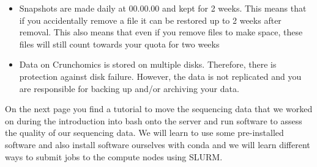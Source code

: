 \documentclass[
  letterpaper,
  DIV=11,
  numbers=noendperiod]{scrreprt}
\providecommand{\tightlist}{%
  \setlength{\itemsep}{0pt}\setlength{\parskip}{0pt}}\usepackage{longtable,booktabs,array}
\begin{document}
\begin{itemize}
\tightlist
\item
  Snapshots are made daily at 00.00.00 and kept for 2 weeks. This means
  that if you accidentally remove a file it can be restored up to 2
  weeks after removal. This also means that even if you remove files to
  make space, these files will still count towards your quota for two
  weeks
\item
  Data on Crunchomics is stored on multiple disks. Therefore, there is
  protection against disk failure. However, the data is not replicated
  and you are responsible for backing up and/or archiving your data.
\end{itemize}

On the next page you find a tutorial to move the sequencing data that we
worked on during the introduction into bash onto the server and run
software to assess the quality of our sequencing data. We will learn to
use some pre-installed software and also install software ourselves with
conda and we will learn different ways to submit jobs to the compute
nodes using SLURM.
\end{document}
